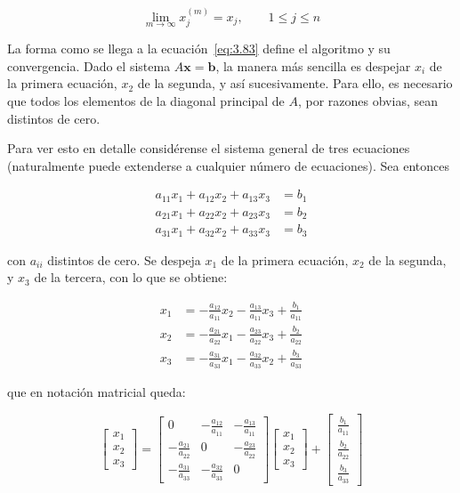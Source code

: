 \documentclass[12pt,letterpaper]{article}
\theoremstyle{definition}
\theoremstyle{plain}
\theoremstyle{remark}
\begin{document}
\begin{equation}
\lim_{m \to \infty} x_j^{(m)} = x_j, \qquad 1 \leq j \leq n
\label{eq:3.85}
\tag{5}
\end{equation}

La forma como se llega a la ecuación~\eqref{eq:3.83} define el algoritmo y su convergencia. Dado el sistema $A \mathbf{x} = \mathbf{b}$, la manera más sencilla es despejar $x_i$ de la primera ecuación, $x_2$ de la segunda, y así sucesivamente. Para ello, es necesario que todos los elementos de la diagonal principal de $A$, por razones obvias, sean distintos de cero.

Para ver esto en detalle considérense el sistema general de tres ecuaciones (naturalmente puede extenderse a cualquier número de ecuaciones). Sea entonces

\[
\begin{aligned}
a_{11}x_1 + a_{12}x_2 + a_{13}x_3 &= b_1 \\
a_{21}x_1 + a_{22}x_2 + a_{23}x_3 &= b_2 \\
a_{31}x_1 + a_{32}x_2 + a_{33}x_3 &= b_3
\end{aligned}
\]

con $a_{ii}$ distintos de cero. Se despeja $x_1$ de la primera ecuación, $x_2$ de la segunda, y $x_3$ de la tercera, con lo que se obtiene:

\begin{equation}
\begin{aligned}
x_1 &= -\frac{a_{12}}{a_{11}}x_2 - \frac{a_{13}}{a_{11}}x_3 + \frac{b_1}{a_{11}} \\
x_2 &= -\frac{a_{21}}{a_{22}}x_1 - \frac{a_{23}}{a_{22}}x_3 + \frac{b_2}{a_{22}} \\
x_3 &= -\frac{a_{31}}{a_{33}}x_1 - \frac{a_{32}}{a_{33}}x_2 + \frac{b_3}{a_{33}}
\end{aligned}
\label{eq:3.86}
\tag{6}
\end{equation}

que en notación matricial queda:

\begin{equation}
\begin{bmatrix}
x_1 \\
x_2 \\
x_3
\end{bmatrix}
=
\begin{bmatrix}
0 & -\frac{a_{12}}{a_{11}} & -\frac{a_{13}}{a_{11}} \\
-\frac{a_{21}}{a_{22}} & 0 & -\frac{a_{23}}{a_{22}} \\
-\frac{a_{31}}{a_{33}} & -\frac{a_{32}}{a_{33}} & 0
\end{bmatrix}
\begin{bmatrix}
x_1 \\
x_2 \\
x_3
\end{bmatrix}
+
\begin{bmatrix}
\frac{b_1}{a_{11}} \\
\frac{b_2}{a_{22}} \\
\frac{b_3}{a_{33}}
\end{bmatrix}
\label{eq:3.87}
\tag{7}
\end{equation}
\end{document}
